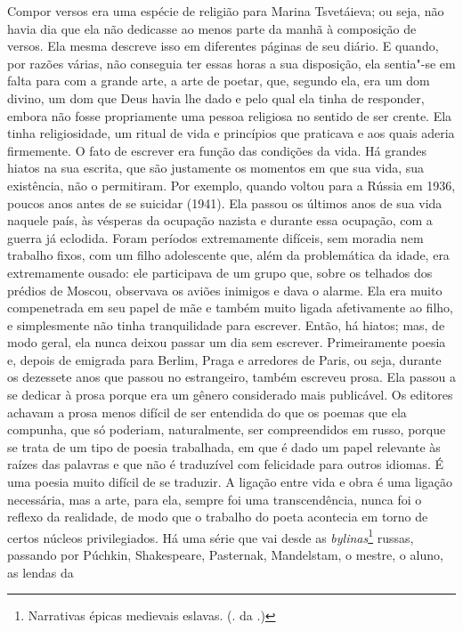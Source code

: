 Compor versos era uma espécie de religião para Marina
Tsvetáieva; ou seja, não havia dia que ela não dedicasse ao menos parte
da manhã à composição de versos. Ela mesma descreve isso em diferentes
páginas de seu diário. E quando, por razões várias, não conseguia ter
essas horas a sua disposição, ela sentia"-se em falta para com a grande
arte, a arte de poetar, que, segundo ela, era um dom divino, um dom que
Deus havia lhe dado e pelo qual ela tinha de responder, embora não fosse
propriamente uma pessoa religiosa no sentido de ser crente. Ela tinha
religiosidade, um ritual de vida e princípios que praticava e aos quais
aderia firmemente. O fato de escrever era função das condições da vida.
Há grandes hiatos na sua escrita, que são justamente os momentos em que
sua vida, sua existência, não o permitiram. Por exemplo, quando voltou
para a Rússia em 1936, poucos anos antes de se suicidar (1941). Ela
passou os últimos anos de sua vida naquele país, às vésperas da ocupação
nazista e durante essa ocupação, com a guerra já eclodida. Foram
períodos extremamente difíceis, sem moradia nem trabalho fixos, com um
filho adolescente que, além da problemática da idade, era extremamente
ousado: ele participava de um grupo que, sobre os telhados dos prédios
de Moscou, observava os aviões inimigos e dava o alarme. Ela era muito
compenetrada em seu papel de mãe e também muito ligada afetivamente ao
filho, e simplesmente não tinha tranquilidade para escrever. Então, há
hiatos; mas, de modo geral, ela nunca deixou passar um dia sem escrever.
Primeiramente poesia e, depois de emigrada para Berlim, Praga e
arredores de Paris, ou seja, durante os dezessete anos que passou no
estrangeiro, também escreveu prosa. Ela passou a se dedicar à prosa
porque era um gênero considerado mais publicável. Os editores achavam a
prosa menos difícil de ser entendida do que os poemas que ela compunha,
que só poderiam, naturalmente, ser compreendidos em russo, porque se
trata de um tipo de poesia trabalhada, em que é dado um papel relevante
às raízes das palavras e que não é traduzível com felicidade para outros
idiomas. É uma poesia muito difícil de se traduzir. A ligação entre vida
e obra é uma ligação necessária, mas a arte, para ela, sempre foi uma
transcendência, nunca foi o reflexo da realidade, de modo que o trabalho
do poeta acontecia em torno de certos núcleos privilegiados. Há uma
série que vai desde as \emph{bylinas}\footnote{Narrativas épicas
  medievais eslavas. (. da .)} russas, passando por Púchkin,
Shakespeare, Pasternak, Mandelstam, o mestre, o aluno, as lendas da
